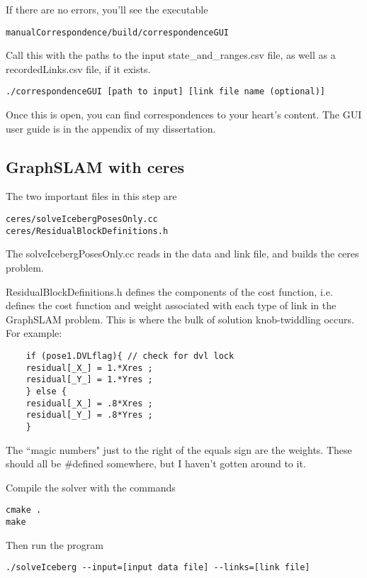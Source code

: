 \documentclass[12pt]{amsart}
\begin{document}
If there are no errors, you'll see the executable 
\begin{lstlisting}
manualCorrespondence/build/correspondenceGUI
\end{lstlisting}

Call this with the paths to the input state\_and\_ranges.csv file, as well as a recordedLinks.csv file, if it exists.

\begin{lstlisting}
./correspondenceGUI [path to input] [link file name (optional)]
\end{lstlisting}

Once this is open, you can find correspondences to your heart's content. The GUI user guide is in the appendix of my dissertation.

\subsection{GraphSLAM with ceres}

The two important files in this step are 
\begin{lstlisting}
ceres/solveIcebergPosesOnly.cc
ceres/ResidualBlockDefinitions.h
\end{lstlisting}

The solveIcebergPosesOnly.cc reads in the data and link file, and builds the ceres problem. 

ResidualBlockDefinitions.h defines the components of the cost function, i.e. defines the cost function and weight associated with each type of link in the GraphSLAM problem. This is where the bulk of solution knob-twiddling occurs. For example:
\begin{lstlisting}
	if (pose1.DVLflag){ // check for dvl lock
	residual[_X_] = 1.*Xres ;
	residual[_Y_] = 1.*Yres ;
	} else {
	residual[_X_] = .8*Xres ;
	residual[_Y_] = .8*Yres ;
	}
\end{lstlisting}

The ``magic numbers" just to the right of the equals sign are the weights. These should all be \#defined somewhere, but I haven't gotten around to it. 

Compile the solver with the commands 
\begin{lstlisting}
cmake .
make
\end{lstlisting}

Then run the program 
\begin{lstlisting}
./solveIceberg --input=[input data file] --links=[link file]
\end{lstlisting}
\end{document}
